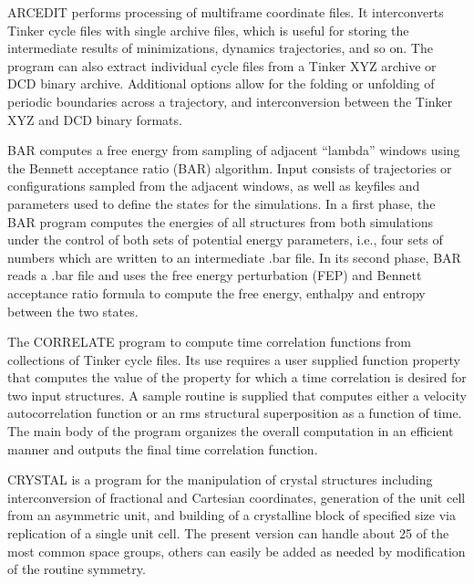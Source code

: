 \documentclass[letterpaper,11pt,english]{sphinxmanual}
\begin{document}
\sphinxAtStartPar
{}

\sphinxAtStartPar
ARCEDIT performs processing of multi\sphinxhyphen{}frame coordinate files. It interconverts Tinker cycle files with single archive files, which is useful for storing the intermediate results of minimizations, dynamics trajectories, and so on. The program can also extract individual cycle files from a Tinker XYZ archive or DCD binary archive. Additional options allow for the folding or unfolding of periodic boundaries across a trajectory, and interconversion between the Tinker XYZ and DCD binary formats.

\sphinxAtStartPar
{}

\sphinxAtStartPar
BAR computes a free energy from sampling of adjacent “lambda” windows using the Bennett acceptance ratio (BAR) algorithm. Input consists of trajectories or configurations sampled from the adjacent windows, as well as keyfiles and parameters used to define the states for the simulations. In a first phase, the BAR program computes the energies of all structures from both simulations under the control of both sets of potential energy parameters, i.e., four sets of numbers which are written to an intermediate .bar file. In its second phase, BAR reads a .bar file and uses the free energy perturbation (FEP) and Bennett acceptance ratio formula to compute the free energy, enthalpy and entropy between the two states.

\sphinxAtStartPar
{}

\sphinxAtStartPar
The CORRELATE program to compute time correlation functions from collections of Tinker cycle files. Its use requires a user supplied function property that computes the value of the property for which a time correlation is desired for two input structures. A sample routine is supplied that computes either a velocity autocorrelation function or an rms structural superposition as a function of time. The main body of the program organizes the overall computation in an efficient manner and outputs the final time correlation function.

\sphinxAtStartPar
{}

\sphinxAtStartPar
CRYSTAL is a program for the manipulation of crystal structures including interconversion of fractional and Cartesian coordinates, generation of the unit cell from an asymmetric unit, and building of a crystalline block of specified size via replication of a single unit cell. The present version can handle about 25 of the most common space groups, others can easily be added as needed by modification of the routine symmetry.
\end{document}
